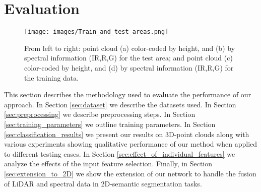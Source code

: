 \documentclass[final,3p,times,twocolumn,authoryear]{elsarticle}
\begin{document}
\section{Evaluation}
\label{sec:evaluation}
\begin{figure*}[th]
\begin{center}
\texttt{[image: images/Train\_and\_test\_areas.png]}
\end{center}
\caption{From left to right: point cloud (a) color-coded by height, and (b) by spectral information (IR,R,G) for the test area; and point cloud (c) color-coded by height, and (d) by spectral information (IR,R,G) for the training data.}
\label{fig:dataset_color}
\end{figure*}
This section describes the methodology used to evaluate the performance of our approach. 
In Section \ref{sec:dataset} we describe the datasets used. 
In Section \ref{sec:preprocessing} we describe preprocessing steps. 
In Section \ref{sec:training_parameters} we outline training parameters. 
In Section \ref{sec:classification_results} we present our results on 3D-point clouds along with various experiments showing qualitative performance of our method when applied to different testing cases. 
In Section \ref{sec:effect_of_individual_features} we analyze the effects of the input feature selection. 
Finally, in Section \ref{sec:extension_to_2D} we show the extension of our network to handle the fusion of LiDAR and spectral data in 2D-semantic segmentation tasks.
\end{document}
